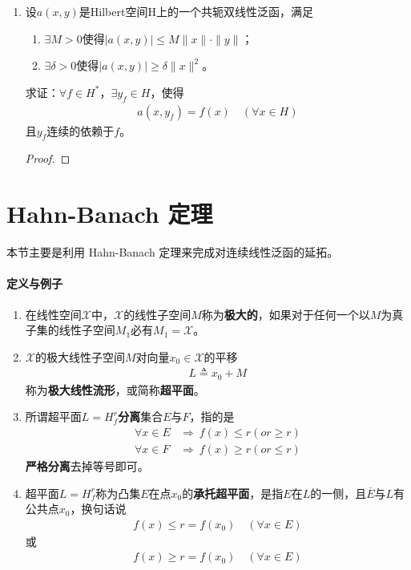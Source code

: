 \begin{enumerate}[leftmargin=2cm, label=\arabic*]
    \item 设$a(x,y)$是Hilbert空间H上的一个共轭双线性泛函，满足
    \begin{enumerate}[leftmargin=1cm, label=(\arabic*)]
        \item $\exists M>0$使得$|a(x,y)| \leqslant M\|x\|\cdot\|y\|$；
        \item $\exists \delta>0$使得$|a(x,y)| \geqslant \delta \|x\|^2$。
    \end{enumerate}
    求证：$\forall f\in H^*$，$\exists y_f\in H$，使得
    \begin{align*}
        a(x,y_f) = f(x) \quad (\forall x\in H)
    \end{align*}
    且$y_f$连续的依赖于$f$。
    \begin{proof}
        
    \end{proof}

    
\end{enumerate}

\section{Hahn-Banach 定理}
本节主要是利用 Hahn-Banach 定理来完成对连续线性泛函的延拓。
\paragraph{定义与例子}
\begin{enumerate}[leftmargin=2cm, label=\arabic*]
    \item 在线性空间$\mathscr{X}$中，$\mathscr{X}$的线性子空间$M$称为\textbf{极大的}，如果对于任何一个以$M$为真子集的线性子空间$M_1$必有$M_1 = \mathscr{X}$。
    \item $\mathscr{X}$的极大线性子空间$M$对向量$x_0\in\mathscr{X}$的平移
    \begin{align*}
        L \triangleq x_0 + M
    \end{align*}
    称为\textbf{极大线性流形}，或简称\textbf{超平面}。
    \item 所谓超平面$L = H_f^r$\textbf{分离}集合$E$与$F$，指的是
    \begin{align*}
        \forall x\in E&\Longrightarrow\ f(x)\leqslant r (or \geqslant r) \\
        \forall x\in F&\Longrightarrow\ f(x)\geqslant r (or \leqslant r)
    \end{align*}
    \textbf{严格分离}去掉等号即可。

    \item 超平面$L = H_f^r$称为凸集$E$在点$x_0$的\textbf{承托超平面}，是指$E$在$L$的一侧，且$\overline{E}$与$L$有公共点$x_0$，换句话说
    \begin{align*}
        f(x) \leqslant r = f(x_0)\quad (\forall x\in E)
    \end{align*}
    或
    \begin{align*}
        f(x) \geqslant r = f(x_0)\quad (\forall x\in E)
    \end{align*}


    
\end{enumerate}


